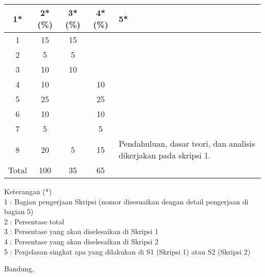 \documentclass[a4paper,twoside]{article}
\begin{document}
\begin{center}
  \begin{tabular}{ | c | c | c | c | l |}
    \hline
    1*  & 2*(\%) & 3*(\%) & 4*(\%) &5*\\ \hline \hline
    1   & 15 & 15 &  &  \\ \hline
    2   & 5 & 5 &  &  \\ \hline
    3   & 10 & 10 &  &  \\ \hline
    4   & 10 &  & 10 &  \\ \hline
    5   & 25 &  & 25 &  \\ \hline
    6   & 10 &  & 10 &  \\ \hline
    7   & 5 &  & 5 &  \\ \hline    
    8	& 20 & 5 & 15 & Pendahuluan, dasar teori, dan analisis dikerjakan pada skripsi 1. \\ \hline
    Total  & 100  & 35  & 65 &  \\ \hline
                          \end{tabular}
\end{center}

Keterangan (*)\\
1 : Bagian pengerjaan Skripsi (nomor disesuaikan dengan detail pengerjaan di bagian 5)\\
2 : Persentase total \\
3 : Persentase yang akan diselesaikan di Skripsi 1 \\
4 : Persentase yang akan diselesaikan di Skripsi 2 \\
5 : Penjelasan singkat apa yang dilakukan di S1 (Skripsi 1) atau S2 (Skripsi 2)

\vspace{1cm}
\centering Bandung, \tanggal\\
\vspace{2cm} \nama \\ 
\vspace{1cm}
\end{document}
